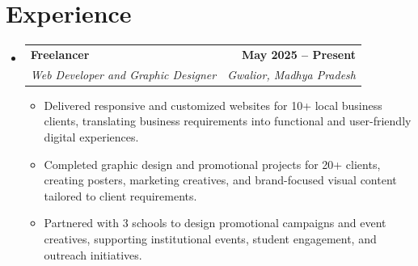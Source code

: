\documentclass[letterpaper,11pt]{article}
\makeatletter
\newcommand{\resumeItem}[1]{
  \item\small{
    {#1 \vspace{-2pt}}
  }
}
\newcommand{\resumeSubheading}[4]{
  \vspace{-2pt}\item
    \begin{tabular*}{1.0\textwidth}[t]{l@{\extracolsep{\fill}}r}
      {\fontsize{12pt}{14pt}\selectfont\bfseries #1} &
      {\fontsize{12pt}{14pt}\selectfont\bfseries\sffamily #2} \\
      {\fontsize{10pt}{12pt}\selectfont\itshape #3} &
      {\fontsize{10pt}{12pt}\selectfont\itshape #4} \\
    \end{tabular*}\vspace{-7pt}
}
\newcommand{\resumeSubHeadingListStart}{\begin{itemize}[leftmargin=0.0in, label={}]}
\newcommand{\resumeSubHeadingListEnd}{\end{itemize}}
\newcommand{\resumeItemListStart}{\begin{itemize}}
\newcommand{\resumeItemListEnd}{\end{itemize}\vspace{-5pt}}
\makeatother
\begin{document}
\section{Experience}
  \resumeSubHeadingListStart

    \resumeSubheading
      {Freelancer}{May 2025 -- Present}
      {Web Developer and Graphic Designer }{Gwalior, Madhya Pradesh}
      \resumeItemListStart
        \resumeItem{Delivered responsive and customized websites for 10+ local business clients, translating business requirements into functional and user-friendly digital experiences.}
        \resumeItem{Completed graphic design and promotional projects for 20+ clients, creating posters, marketing creatives, and brand-focused visual content tailored to client requirements.}
        \resumeItem{Partnered with 3 schools to design promotional campaigns and event creatives, supporting institutional events, student engagement, and outreach initiatives.}
      \resumeItemListEnd

    
  \resumeSubHeadingListEnd
\vspace{-16pt}

\end{document}
